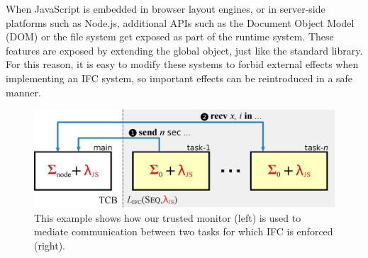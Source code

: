 When JavaScript is embedded in browser layout engines,
or in server-side platforms such as Node.js,
additional APIs such as the Document Object Model (DOM) or the file
system get exposed as part of the runtime system.
These features are exposed by extending the global object, just like
the standard library.  For this reason, it is easy to modify
these systems to forbid external effects when implementing
an IFC system, so important effects can be reintroduced in a safe manner.



\begin{figure}[t]
\centerline{\includegraphics[width=0.7\columnwidth]{figs/node}}
\caption{\label{fig:node}
This example shows how our trusted monitor (left) is used to mediate
communication between two tasks for which IFC is enforced (right).}
\end{figure}
%

